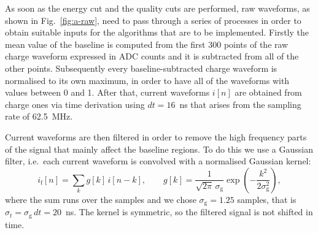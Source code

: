 As soon as the energy cut and the quality cuts are performed, raw waveforms, as shown in Fig.~\ref{fig:a-raw}, need to pass through a series of processes in order to obtain suitable inputs for the algorithms that are to be implemented. Firstly the mean value of the baseline is computed from the first 300 points of the raw charge waveform expressed in ADC counts and it is subtracted from all of the other points. Subsequently every baseline-subtracted charge waveform is normalised to its own maximum, in order to have all of the waveforms with values between 0 and 1. After that, current waveforms $i[n]$ are obtained from charge ones via time derivation using $dt = 16$~ns that arises from the sampling rate of 62.5~MHz.

Current waveforms are then filtered in order to remove the high frequency parts of the signal that mainly affect the baseline regions. To do this we use a Gaussian filter, i.e.\ each current waveform is convolved with a normalised Gaussian kernel:
\begin{equation}
    i_\mathrm{f}[n] = \sum_{k} g[k]\, i[n-k], \qquad
    g[k] = \frac{1}{\sqrt{2\pi}\,\sigma_\mathrm{g}} \exp\!\left(-\frac{k^2}{2\sigma_\mathrm{g}^2}\right),
    \label{eq:gauss-kernel}
\end{equation}
where the sum runs over the samples and we chose $\sigma_\mathrm{g} = 1.25$ samples, that is $\sigma_t = \sigma_\mathrm{g}\, dt = 20$~ns. The kernel is symmetric, so the filtered signal is not shifted in time. 



